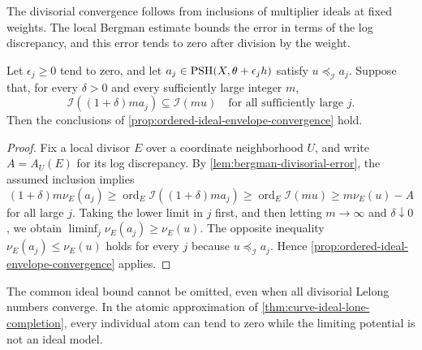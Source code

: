 The divisorial convergence follows from inclusions of multiplier ideals at fixed weights. The local Bergman estimate bounds the error in terms of the log discrepancy, and this error tends to zero after division by the weight.

\begin{corollary}\label{cor:fixed-weight-envelope-convergence}
Let $\epsilon_j\geq0$ tend to zero, and let $a_j\in\mathrm{PSH}(X,\theta+\epsilon_jh)$ satisfy $u\preceq_{\mathcal I}a_j$. Suppose that, for every $\delta>0$ and every sufficiently large integer $m$,
\[
 \mathcal I((1+\delta)m a_j)\subseteq\mathcal I(mu)
 \quad\text{for all sufficiently large }j.
\]
Then the conclusions of \cref{prop:ordered-ideal-envelope-convergence} hold.
\end{corollary}
\begin{proof}
Fix a local divisor $E$ over a coordinate neighborhood $U$, and write $A=A_U(E)$ for its log discrepancy. By \cref{lem:bergman-divisorial-error}, the assumed inclusion implies
\[
 (1+\delta)m\nu_E(a_j)
 \geq\operatorname{ord}_E\mathcal I((1+\delta)m a_j)
 \geq\operatorname{ord}_E\mathcal I(mu)
 \geq m\nu_E(u)-A
\]
for all large $j$. Taking the lower limit in $j$ first, and then letting $m\to\infty$ and $\delta\downarrow0$, we obtain $\liminf_j\nu_E(a_j)\geq\nu_E(u)$. The opposite inequality $\nu_E(a_j)\leq\nu_E(u)$ holds for every $j$ because $u\preceq_{\mathcal I}a_j$. Hence \cref{prop:ordered-ideal-envelope-convergence} applies.
\end{proof}

The common ideal bound cannot be omitted, even when all divisorial Lelong numbers converge. In the atomic approximation of \cref{thm:curve-ideal-lone-completion}, every individual atom can tend to zero while the limiting potential is not an ideal model.

